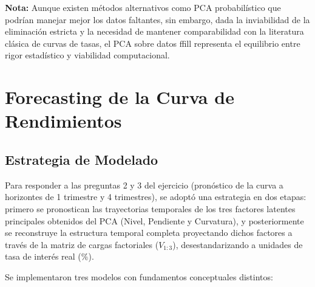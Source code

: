 \documentclass[11pt]{article}
\begin{document}
\noindent \textbf{Nota:} Aunque existen métodos alternativos como PCA probabilístico que podrían manejar mejor los datos faltantes, sin embargo, dada la inviabilidad de la eliminación estricta y la necesidad de mantener comparabilidad con la literatura clásica de curvas de tasas, el PCA sobre datos ffill representa el equilibrio  entre rigor estadístico y viabilidad computacional.


\pagebreak

\section{Forecasting de la Curva de Rendimientos}

\subsection{Estrategia de Modelado}

Para responder a las preguntas 2 y 3 del ejercicio (pronóstico de la curva a horizontes de 1 trimestre y 4 trimestres), se adoptó una estrategia en dos etapas: primero se pronostican las trayectorias temporales de los tres factores latentes principales obtenidos del PCA (Nivel, Pendiente y Curvatura), y posteriormente se reconstruye la estructura temporal completa proyectando dichos factores a través de la matriz de cargas factoriales ($V_{1:3}$), desestandarizando a unidades de tasa de interés real ($\%$).

Se implementaron tres modelos con fundamentos conceptuales distintos:
\end{document}
